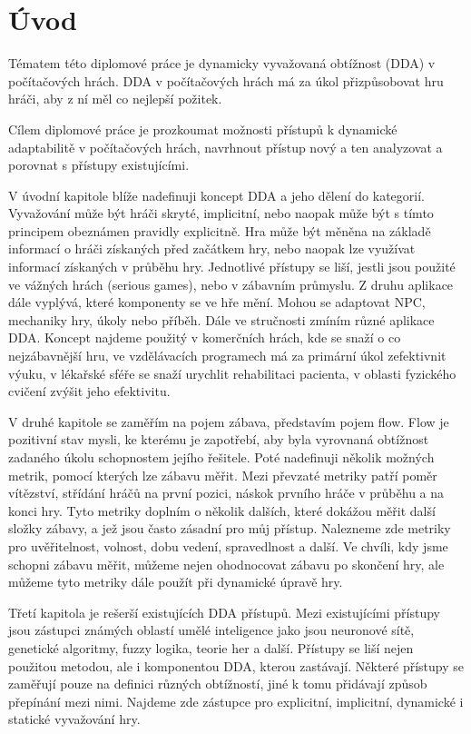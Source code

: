 \chapter{Úvod}

Tématem této diplomové práce je dynamicky vyvažovaná obtížnost (DDA) v počítačových hrách. DDA v počítačových hrách má za úkol přizpůsobovat hru hráči, aby z ní měl co nejlepší požitek. 

Cílem diplomové práce je prozkoumat možnosti přístupů k dynamické adaptabilitě v počítačových hrách, navrhnout přístup nový a ten analyzovat a porovnat s přístupy existujícími.

V úvodní kapitole blíže nadefinuji koncept DDA a jeho dělení do kategorií. Vyvažování může být hráči skryté, implicitní, nebo naopak může být s tímto principem obeznámen pravidly explicitně. Hra může být měněna na základě informací o hráči získaných před začátkem hry, nebo naopak lze využívat informací získaných v průběhu hry. Jednotlivé přístupy se liší, jestli jsou použité ve vážných hrách (serious games), nebo v zábavním průmyslu. Z druhu aplikace dále vyplývá, které komponenty se ve hře mění. Mohou se adaptovat NPC, mechaniky hry, úkoly nebo příběh.
Dále ve stručnosti zmíním různé aplikace DDA. Koncept najdeme použitý v komerčních hrách, kde se snaží o co nejzábavnější hru, ve vzdělávacích programech má za primární úkol zefektivnit výuku, v lékařské sféře se snaží urychlit rehabilitaci pacienta, v oblasti fyzického cvičení zvýšit jeho efektivitu.

V druhé kapitole se zaměřím na pojem zábava, představím pojem flow. Flow je pozitivní stav mysli, ke kterému je zapotřebí, aby byla vyrovnaná obtížnost zadaného úkolu schopnostem jejího řešitele. Poté nadefinuji několik možných metrik, pomocí kterých lze zábavu měřit. Mezi převzaté metriky patří poměr vítězství, střídání hráčů na první pozici, náskok prvního hráče v průběhu a na konci hry. Tyto metriky doplním o několik dalších, které dokážou měřit další složky zábavy, a jež jsou často zásadní pro můj přístup. Nalezneme zde metriky pro uvěřitelnost, volnost, dobu vedení, spravedlnost a další. Ve chvíli, kdy jsme schopni zábavu měřit, můžeme nejen ohodnocovat zábavu po skončení hry, ale můžeme tyto metriky dále použít při dynamické úpravě hry. 

Třetí kapitola je rešerší existujících DDA přístupů. Mezi existujícími přístupy jsou zástupci známých oblastí umělé inteligence jako jsou neuronové sítě, genetické algoritmy, fuzzy logika, teorie her a další. Přístupy se liší nejen použitou metodou, ale i komponentou DDA, kterou zastávají. Některé přístupy se zaměřují pouze na definici různých obtížností, jiné k tomu přidávají způsob přepínání mezi nimi. Najdeme zde zástupce pro explicitní, implicitní, dynamické i statické vyvažování hry. 


